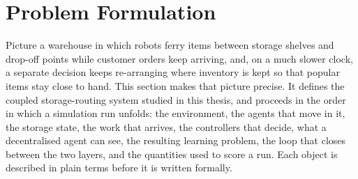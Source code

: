 \documentclass[../main.tex]{subfiles}
\begin{document}
%
%
%

\section{Problem Formulation}
\label{sec:problem}

Picture a warehouse in which robots ferry items between storage shelves and
drop-off points while customer orders keep arriving, and, on a much slower
clock, a separate decision keeps re-arranging where inventory is kept so that
popular items stay close to hand. This section makes that picture precise. It
defines the coupled storage-routing system studied in this thesis, and
proceeds in the order in which a simulation run unfolds: the environment, the
agents that move in it, the storage state, the work that arrives, the
controllers that decide, what a decentralised agent can see, the resulting
learning problem, the loop that closes between the two layers, and the
quantities used to score a run. Each object is described in plain terms before
it is written formally.
\end{document}
